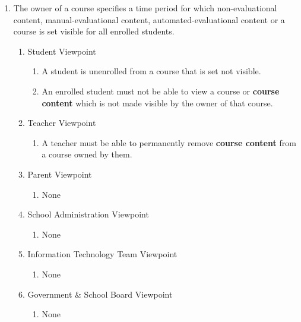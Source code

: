 \documentclass[]{article}
\begin{document}
\begin{enumerate}[{BE}1.]
	\item The owner of a course specifies a time period for which non-evaluational content, manual-evaluational content, automated-evaluational content or a course is set visible for all enrolled students.
	\begin{enumerate}[{VP2}.1]
		\item Student Viewpoint
			\begin{enumerate}
				\item A student is unenrolled from a course that is set not visible.
				\item An enrolled student must not be able to view a course or \textbf{course content} which is not made visible by the owner of that course.
			\end{enumerate}
		\item Teacher Viewpoint
			\begin{enumerate}
				\item A teacher must be able to permanently remove \textbf{course content} from a course owned by them.
			\end{enumerate}
		\item Parent Viewpoint
			\begin{enumerate}
				\item None
			\end{enumerate}
		\item School Administration Viewpoint
			\begin{enumerate}
				\item None
			\end{enumerate}
		\item Information Technology Team Viewpoint
			\begin{enumerate}
				\item None
			\end{enumerate}
		\item Government \& School Board Viewpoint
			\begin{enumerate}
				\item None
			\end{enumerate}
	\end{enumerate}



\end{enumerate}
\end{document}
